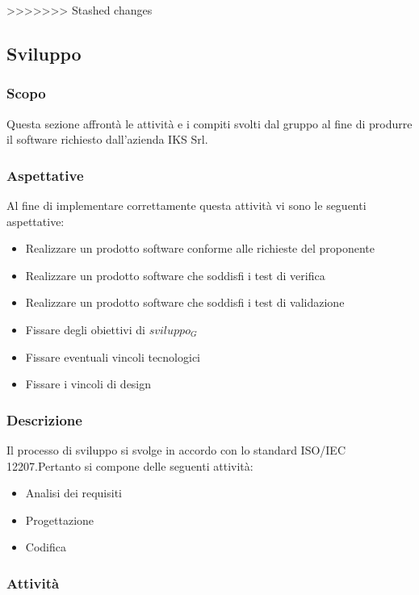 >>>>>>> Stashed changes
	
\subsection{Sviluppo}
	\subsubsection{Scopo}
	Questa sezione affrontà le attività e i compiti svolti dal gruppo al fine di produrre il software richiesto dall'azienda IKS Srl.
	
	\subsubsection{Aspettative}
	Al fine di implementare correttamente questa attività vi sono le seguenti aspettative:
	\begin{itemize}
		\item Realizzare un prodotto software conforme alle richieste del proponente
		\item Realizzare un prodotto software che soddisfi i test di verifica
		\item Realizzare un prodotto software che soddisfi i test di validazione
		\item Fissare degli obiettivi di $sviluppo_G$
		\item Fissare eventuali vincoli tecnologici
		\item Fissare i vincoli di design
	\end{itemize}
	
	\subsubsection{Descrizione}
	Il processo di sviluppo si svolge in accordo con lo standard ISO/IEC 12207.Pertanto si compone delle seguenti attività:
	\begin{itemize}
		\item Analisi dei requisiti
		\item Progettazione
		\item Codifica
	\end{itemize}
	
	\subsubsection{Attività}
